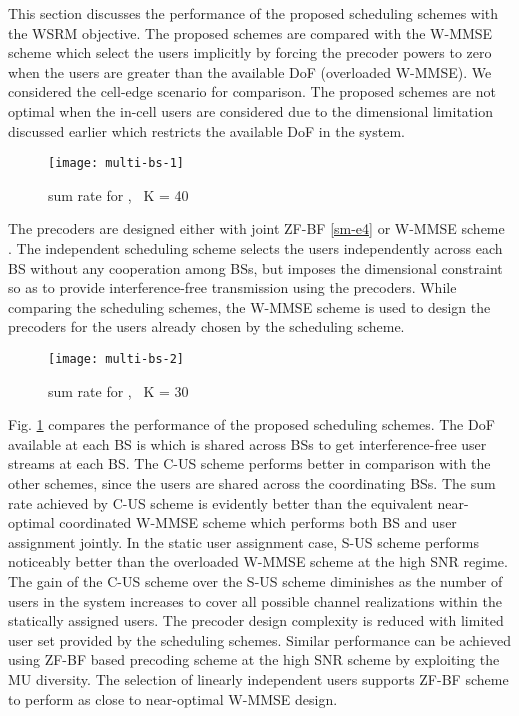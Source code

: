 ﻿
This section discusses the performance of the proposed scheduling schemes with the \ac{WSRM} objective. The proposed schemes are compared with the \ac{W-MMSE} scheme which select the users implicitly by forcing the precoder powers to zero when the users are greater than the available \ac{DoF} (overloaded \ac{W-MMSE}). We considered the cell-edge scenario for comparison. The proposed schemes are not optimal when the in-cell users are considered due to the dimensional limitation \me{\mu} discussed earlier which restricts the available \ac{DoF} in the system.
\begin{figure}
\centering
\texttt{[image: multi-bs-1]}
\caption[short]{sum rate for , \, K = 40}
\label{multi-bs-f1}
\vskip -0.2in
\end{figure}

The precoders are designed either with joint \ac{ZF}-\ac{BF} \eqref{sm-e4} or \ac{W-MMSE} scheme \cite{wmmse_shi}. The independent scheduling scheme selects the users independently across each \ac{BS} without any cooperation among \ac{BS}s, but imposes the dimensional constraint \me{\mu} so as to provide interference-free transmission using the precoders. While comparing the scheduling schemes, the \ac{W-MMSE} scheme is used to design the precoders for the users already chosen by the scheduling scheme.
\begin{figure}
\centering
\texttt{[image: multi-bs-2]}
\caption[short]{sum rate for , \, K = 30}
\label{multi-bs-f2}
\vskip -0.1in
\end{figure}

Fig. \ref{multi-bs-f1} compares the performance of the proposed scheduling schemes. The \ac{DoF} available at each \ac{BS} is  which is shared across \ac{BS}s to get \me{\mu} interference-free user streams at each \ac{BS}. The \ac{C-US} scheme performs better in comparison with the other schemes, since the users are shared across the coordinating \ac{BS}s. The sum rate achieved by \ac{C-US} scheme is evidently better than the equivalent near-optimal coordinated \ac{W-MMSE} scheme which performs both \ac{BS} and user assignment jointly. In the static user assignment case, \ac{S-US} scheme performs noticeably better than the overloaded \ac{W-MMSE} scheme at the high \ac{SNR} regime. The gain of the \ac{C-US} scheme over the \ac{S-US} scheme diminishes as the number of users in the system increases to cover all possible channel realizations within the statically assigned users. The precoder design complexity is reduced with limited user set provided by the scheduling schemes. Similar performance can be achieved using \ac{ZF}-\ac{BF} based precoding scheme at the high \ac{SNR} scheme by exploiting the \ac{MU} diversity. The selection of linearly independent users supports \ac{ZF}-\ac{BF} scheme to perform as close to near-optimal \ac{W-MMSE} design.

